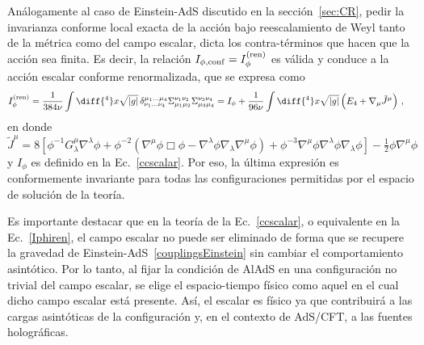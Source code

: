 \documentclass[../Main.tex]{subfiles}
\begin{document}
Análogamente al caso de Einstein-AdS discutido en la sección~\ref{sec:CR}, pedir la invarianza conforme local exacta de la acción bajo reescalamiento de Weyl tanto de la métrica como del campo escalar, dicta los contra-términos que hacen que la acción sea finita. Es decir, la relación $I_{\phi,\rm conf}=I_{\phi}^{\rm (ren)}$ es válida y conduce a la acción escalar conforme renormalizada, que se expresa como
\begin{align}
I_{\phi}^{\rm (ren)}&=\frac{1}{384\nu}\int\diff{^4}x\sqrt{|g|}\,\delta^{\mu_1\ldots\mu_4}_{\nu_1\ldots\nu_4}\Sigma^{\nu_1\nu_2}_{\mu_1\mu_2}\Sigma^{\nu_3\nu_4}_{\mu_3\mu_4}= I_{\phi}+\frac{1}{96\nu}\int \diff{^4}x\sqrt{|g|} \left(E_4 + \nabla_\mu \tilde{J}^\mu\right) \,,
\label{Iphiren}
\end{align}
en donde
\begin{equation}
\tilde{J}^{\mu} = 8 \left[\phi^{-1} G^\mu_\lambda\nabla^\lambda\phi+ \phi^{-2} \left(\nabla^{\mu} \phi \Box \phi -\nabla^{\lambda} \phi\nabla_{\lambda}\nabla^{\mu} \phi \right) + \phi^{-3} \nabla^{\mu} \phi \nabla^{\lambda} \phi \nabla_{\lambda} \phi \right]-\tfrac{1}{2}\phi\nabla^{\mu}\phi \,
\end{equation}
y $I_{\phi}$ es definido en la Ec.~\eqref{ccscalar}.
Por eso, la última expresión es conformemente invariante para todas las configuraciones permitidas por el espacio de solución de la teoría.

Es importante destacar que en la teoría de la Ec.~\eqref{ccscalar}, o equivalente en la Ec.~\eqref{Iphiren}, el campo escalar no puede ser eliminado de forma que se recupere la gravedad de Einstein-AdS~\eqref{couplingsEinstein} sin cambiar el comportamiento asintótico. Por lo tanto, al fijar la condición de AlAdS en una configuración no trivial del campo escalar, se elige el espacio-tiempo físico como aquel en el cual dicho campo escalar está presente. Así, el escalar es físico ya que contribuirá a las cargas asintóticas de la configuración y, en el contexto de AdS/CFT, a las fuentes holográficas.



\biblio %
\end{document}
